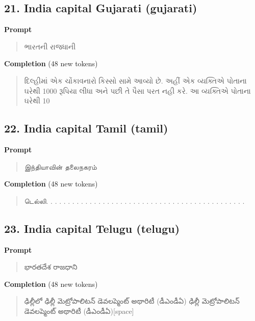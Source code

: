 \documentclass[10pt,a4paper]{article}
\begin{document}
\subsection*{21. India capital Gujarati (gujarati)}
\textbf{Prompt}\par
\begin{quote}\small\raggedright \gujaratifont ભારતની રાજધાની\par\end{quote}
\textbf{Completion} (48 new tokens)\par
\begin{quote}\small\raggedright \gujaratifont દિલ્હીમાં એક ચોંકાવનારો કિસ્સો સામે આવ્યો છે. અહીં એક વ્યક્તિએ પોતાના ઘરેથી 1000 રૂપિયા લીધા અને પછી તે પૈસા પરત નહી કરે. આ વ્યક્તિએ પોતાના ઘરેથી 10\par\end{quote}
\filbreak
\subsection*{22. India capital Tamil (tamil)}
\textbf{Prompt}\par
\begin{quote}\small\raggedright \tamilfont இந்தியாவின் தலைநகரம்\par\end{quote}
\textbf{Completion} (48 new tokens)\par
\begin{quote}\small\raggedright \tamilfont டெல்லி. . . . . . . . . . . . . . . . . . . . . . . . . . . . . . . . . . . . . . . . . . . . . .\par\end{quote}
\filbreak
\subsection*{23. India capital Telugu (telugu)}
\textbf{Prompt}\par
\begin{quote}\small\raggedright \telugufont భారతదేశ రాజధాని\par\end{quote}
\textbf{Completion} (48 new tokens)\par
\begin{quote}\small\raggedright \telugufont \hspace*{0.5em}ఢిల్లీలో ఢిల్లీ మెట్రోపాలిటన్ డెవలప్మెంట్ అథారిటీ (డీఎండీఏ) ఢిల్లీ మెట్రోపాలిటన్ డెవలప్మెంట్ అథారిటీ (డీఎండీఏ)[space]\par\end{quote}
\end{document}
